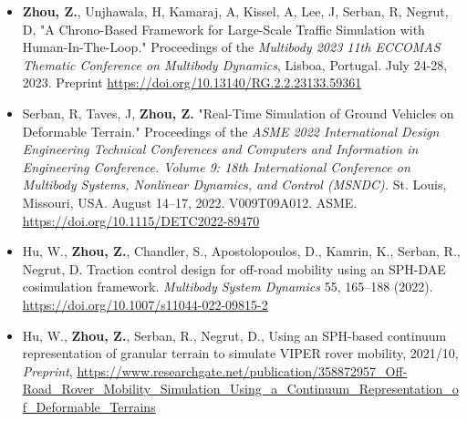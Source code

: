 



\begin{footnotesize}

\begin{itemize}[leftmargin=2ex, nosep, noitemsep]
	
	\item {\textbf{Zhou, Z.}, Unjhawala, H, Kamaraj, A, Kissel, A, Lee, J, Serban, R, Negrut, D,  "A Chrono-Based Framework for Large-Scale Traffic Simulation with Human-In-The-Loop." Proceedings of the \textit {Multibody 2023 11th ECCOMAS Thematic Conference on Multibody Dynamics}, Lisboa, Portugal. July 24-28, 2023. Preprint \url{https://doi.org/10.13140/RG.2.2.23133.59361}}
	
	
	\item {Serban, R, Taves, J, \textbf{Zhou, Z.} "Real-Time Simulation of Ground Vehicles on Deformable Terrain." Proceedings of the \textit {ASME 2022 International Design Engineering Technical Conferences and Computers and Information in Engineering Conference. Volume 9: 18th International Conference on Multibody Systems, Nonlinear Dynamics, and Control (MSNDC).} St. Louis, Missouri, USA. August 14–17, 2022. V009T09A012. ASME. \url{https://doi.org/10.1115/DETC2022-89470}}
	
	
	\item {Hu, W., \textbf{Zhou, Z.}, Chandler, S., Apostolopoulos, D., Kamrin, K., Serban, R., Negrut, D. Traction control design for off-road mobility using an SPH-DAE cosimulation framework. \textit {Multibody System Dynamics} 55, 165–188 (2022). \url{https://doi.org/10.1007/s11044-022-09815-2}}
	
	
	\item {Hu, W., \textbf{Zhou, Z.}, Serban, R., Negrut, D., Using an SPH-based continuum representation of granular terrain to simulate VIPER rover mobility, 2021/10, \textit{Preprint}, \url{https://www.researchgate.net/publication/358872957_Off-Road_Rover_Mobility_Simulation_Using_a_Continuum_Representation_of_Deformable_Terrains}}
	

\end{itemize}
\end{footnotesize}
